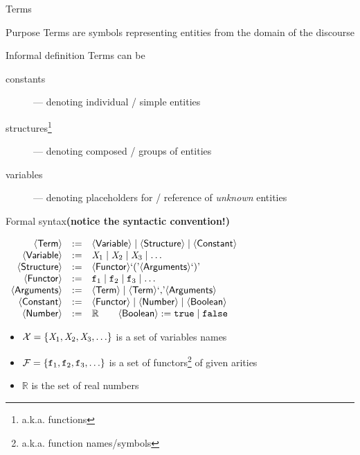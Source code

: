 \documentclass[presentation]{beamer}\mode<presentation>{\usetheme{AMSBolognaFC}}
\begin{document}
\begin{frame}[allowframebreaks]{Terms}
    \begin{block}{Purpose}\centering
        Terms are symbols representing entities from the \alert{domain of the discourse}
    \end{block}
    \begin{block}{Informal definition}
        Terms can be
        \begin{description}
            \item[constants] --- denoting \alert{individual} / simple entities
            \item[structures\footnote{a.k.a. functions}] --- denoting \alert{composed} / groups of entities
            \item[variables] --- denoting \alert{placeholders} for / reference of \emph{unknown} entities
        \end{description}
    \end{block}
    \begin{alertblock}{Formal syntax\hfill\textbf{\footnotesize(notice the syntactic convention!)}}\label{slide:terms}
        \begin{center}
            $\begin{array}{rcl}
                \mathsf{\left\langle Term\right\rangle} & := & \mathsf{\left\langle Variable\right\rangle} \mid \mathsf{\left\langle Structure\right\rangle} \mid \mathsf{\left\langle Constant\right\rangle}
                \\
                \mathsf{\left\langle Variable\right\rangle} & := & \mathit{X}_1 \mid \mathit{X}_2 \mid \mathit{X}_3 \mid \ldots
                \\
                \mathsf{\left\langle Structure\right\rangle} & := & \mathsf{\left\langle Functor\right\rangle} \text{`}\mathit{(}\text{'} \mathsf{\left\langle Arguments\right\rangle} \text{`}\mathit{)}\text{'}
                \\
                \mathsf{\left\langle Functor\right\rangle} & := & \mathtt{f}_1 \mid \mathtt{f}_2 \mid \mathtt{f}_3 \mid \ldots
                \\
                \mathsf{\left\langle Arguments\right\rangle} & := & \mathsf{\left\langle Term\right\rangle} \mid \mathsf{\left\langle Term\right\rangle} \text{`}\mathit{,}\text{'} \mathsf{\left\langle Arguments\right\rangle}
                \\
                \mathsf{\left\langle Constant\right\rangle} & := & \mathsf{\left\langle Functor\right\rangle} \mid \mathsf{\left\langle Number\right\rangle}\mid \mathsf{\left\langle Boolean\right\rangle}
                \\
                \mathsf{\left\langle Number\right\rangle} & := & \mathbb{R} \qquad \mathsf{\left\langle Boolean\right\rangle} :=  \mathtt{true} \mid \mathtt{false}
            \end{array}$
        \end{center}
        \begin{itemize}
            \item $\mathcal{X} = \{ \mathit{X}_1, \mathit{X}_2, \mathit{X}_3, \ldots \}$ is a set of \alert{variables names}
            \item $\mathcal{F} = \{ \mathtt{f}_1, \mathtt{f}_2, \mathtt{f}_3, \ldots \}$ is a set of \alert{functors}\footnote{a.k.a. function names/symbols} of given \alert{arities}
            \item $\mathbb{R}$ is the set of real numbers
        \end{itemize}
    \end{alertblock}


\end{frame}
\end{document}
